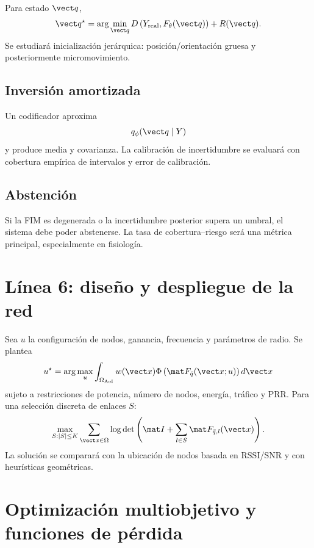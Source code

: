 Para estado $\vect q$,
\begin{equation}
\vect q^\star=\arg\min_{\vect q}
D\left(Y_{\rm real},F_\theta(\vect q)\right)+R(\vect q).
\end{equation}
Se estudiará inicialización jerárquica: posición/orientación gruesa y posteriormente micromovimiento.

\subsection{Inversión amortizada}

Un codificador aproxima
\begin{equation}
q_\phi(\vect q\mid Y)
\end{equation}
y produce media y covarianza. La calibración de incertidumbre se evaluará con cobertura empírica de intervalos y error de calibración.

\subsection{Abstención}

Si la FIM es degenerada o la incertidumbre posterior supera un umbral, el sistema debe poder abstenerse. La tasa de cobertura--riesgo será una métrica principal, especialmente en fisiología.

\section{Línea 6: diseño y despliegue de la red}

Sea $u$ la configuración de nodos, ganancia, frecuencia y parámetros de radio. Se plantea
\begin{equation}
u^\star=\arg\max_u
\int_{\Omega_{\rm AoI}}
w(\vect x)
\Phi\left(\mat F_{\bar q}(\vect x;u)\right)d\vect x
\label{eq:deployment_opt}
\end{equation}
sujeto a restricciones de potencia, número de nodos, energía, tráfico y PRR. Para una selección discreta de enlaces $S$:
\begin{equation}
\max_{S:|S|\le K}
\sum_{\vect x\in\Omega}
\log\det\left(
\mat I+\sum_{l\in S}\mat F_{\bar q,l}(\vect x)
\right).
\label{eq:doptimal}
\end{equation}
La solución se comparará con la ubicación de nodos basada en RSSI/SNR y con heurísticas geométricas.

\section{Optimización multiobjetivo y funciones de pérdida}

